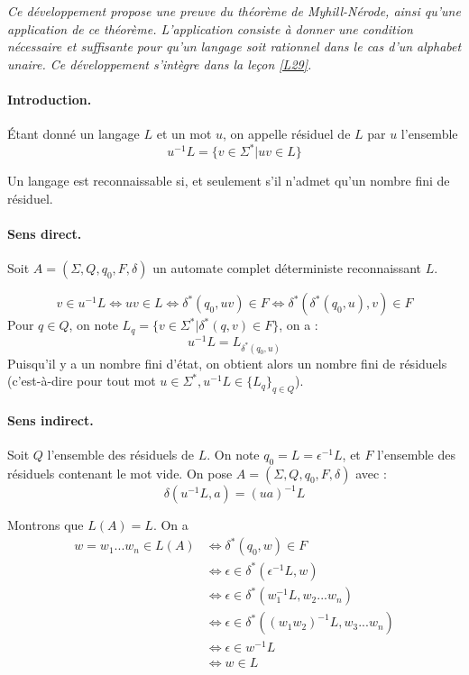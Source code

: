 

\textit{
Ce développement propose une preuve du théorème de Myhill-Nérode, ainsi qu'une application de ce théorème. L'application consiste à donner une condition nécessaire et suffisante pour qu'un langage soit rationnel dans le cas d'un alphabet unaire. Ce développement s'intègre dans la leçon \ref{L29}.}

\paragraph{Introduction.} Étant donné un langage $L$ et un mot $u$, on appelle résiduel de $L$ par $u$ l'ensemble 
$$
u^{-1}L=\{v\in \Sigma^*| uv\in L\}
$$
\begin{theorem}
Un langage est reconnaissable si, et seulement s'il n'admet qu'un nombre fini de résiduel.
\end{theorem}

\paragraph{Sens direct.} Soit $A=(\Sigma,Q,q_0,F,\delta)$ un automate complet déterministe reconnaissant $L$. 

$$
v\in u^{-1}L \Leftrightarrow uv \in L \Leftrightarrow \delta^*(q_0,uv)\in F \Leftrightarrow \delta^*(\delta^*(q_0,u),v)\in F
$$
Pour $q\in Q$, on note $L_q = \{v\in \Sigma^* | \delta^*(q,v)\in F\}$, on a :
$$
u^{-1}L=L_{\delta^*(q_0,u)}
$$
Puisqu'il y a un nombre fini d'état, on obtient alors un nombre fini de résiduels (c'est-à-dire pour tout mot $u\in \Sigma^*, u^{-1}L \in \{L_q\}_{q\in Q}$).

\paragraph{Sens indirect.} Soit $Q$ l'ensemble des résiduels de $L$. On note $q_0 = L = \epsilon^{-1}L$, et $F$ l'ensemble des résiduels contenant le mot vide. On pose $A=(\Sigma,Q,q_0,F,\delta)$ avec :
$$
\delta(u^{-1}L,a) = (ua)^{-1}L
$$

Montrons que $L(A)=L$. On a 
\begin{align*}
w=w_1...w_n\in L(A) &\Leftrightarrow \delta^*(q_0,w)\in F \\
&\Leftrightarrow \epsilon \in \delta^*(\epsilon^{-1}L,w) \\
&\Leftrightarrow \epsilon \in \delta^*(w_1^{-1}L, w_2...w_n) \\
&\Leftrightarrow \epsilon \in \delta^*((w_1w_2)^{-1}L, w_3...w_n) \\
&\Leftrightarrow \epsilon \in w^{-1}L \\
&\Leftrightarrow w \in L 
\end{align*}

